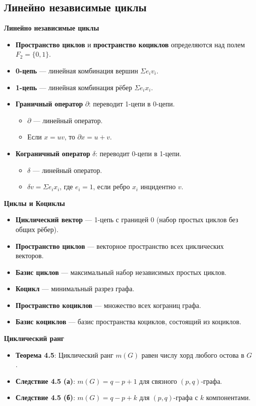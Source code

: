\subsection{Линейно независимые циклы}

\noindent\textbf{Линейно независимые циклы}
\begin{itemize}
    \item \textbf{Пространство циклов} и \textbf{пространство коциклов} определяются над полем $F_2 = \{0, 1\}$.
    \item \textbf{0-цепь} — линейная комбинация вершин $\Sigma e_i v_i$.
    \item \textbf{1-цепь} — линейная комбинация рёбер $\Sigma e_i x_i$.
    \item \textbf{Граничный оператор} $\partial$: переводит 1-цепи в 0-цепи.
    \begin{itemize}
        \item $\partial$ — линейный оператор.
        \item Если $x = uv$, то $\partial x = u + v$.
    \end{itemize}
    \item \textbf{Кограничный оператор} $\delta$: переводит 0-цепи в 1-цепи.
    \begin{itemize}
        \item $\delta$ — линейный оператор.
        \item $\delta v = \Sigma e_i x_i$, где $e_i = 1$, если ребро $x_i$ инцидентно $v$.
    \end{itemize}
\end{itemize}

\noindent\textbf{Циклы и Коциклы}
\begin{itemize}
    \item \textbf{Циклический вектор} — 1-цепь с границей 0 (набор простых циклов без общих рёбер).
    \item \textbf{Пространство циклов} — векторное пространство всех циклических векторов.
    \item \textbf{Базис циклов} — максимальный набор независимых простых циклов.
    \item \textbf{Коцикл} — минимальный разрез графа.
    \item \textbf{Пространство коциклов} — множество всех кограниц графа.
    \item \textbf{Базис коциклов} — базис пространства коциклов, состоящий из коциклов.
\end{itemize}

\noindent\textbf{Циклический ранг}
\begin{itemize}
    \item \textbf{Теорема 4.5}: Циклический ранг $m(G)$ равен числу хорд любого остова в $G$.
    \item \textbf{Следствие 4.5 (а)}: $m(G) = q - p + 1$ для связного $(p, q)$-графа.
    \item \textbf{Следствие 4.5 (б)}: $m(G) = q - p + k$ для $(p, q)$-графа с $k$ компонентами.
\end{itemize}

